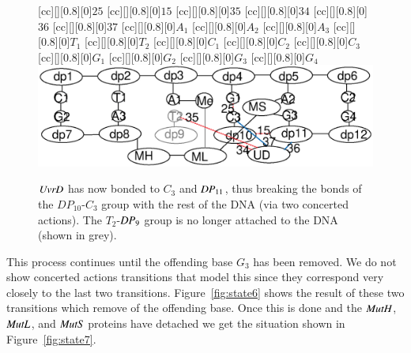 \begin{figure}[h!]
[cc][][0.8][0]{$25$}
[cc][][0.8][0]{$15$}
[cc][][0.8][0]{$35$}
[cc][][0.8][0]{$34$}
[cc][][0.8][0]{$36$}
[cc][][0.8][0]{$37$}
[cc][][0.8][0]{${A_1}$}
[cc][][0.8][0]{${A_2}$}
[cc][][0.8][0]{${A_3}$}
[cc][][0.8][0]{${T_1}$}
[cc][][0.8][0]{\color{gray}${T_2}$}
[cc][][0.8][0]{${C_1}$}
[cc][][0.8][0]{${C_2}$}
[cc][][0.8][0]{${C_3}$}
[cc][][0.8][0]{${G_1}$}
[cc][][0.8][0]{${G_2}$}
[cc][][0.8][0]{${G_3}$}
[cc][][0.8][0]{${G_4}$}
  \centering
    \includegraphics[width=1.0\textwidth]{mmr/state4}
  \caption[A six base pair DNA fragment.]{%
  $\mathit{UvrD}$ has now bonded to $C_3$ and $\mathit{DP}_{11}$, thus breaking the bonds of the $DP_{10}$-$C_3$ group with the rest of the DNA (via two concerted actions). The $T_2$-$\mathit{DP}_{9}$ group is no longer attached to the DNA (shown in grey). %
}
  \label{fig:state4}
\end{figure}

This process continues until the offending base $G_3$ has been removed. We do not show concerted actions transitions that model this since they correspond very closely to the last two transitions. Figure~\ref{fig:state6} shows the result of these two transitions which remove of the offending base.
Once this is done and the $\mathit{MutH}$, $\mathit{MutL}$, and $\mathit{MutS}$ proteins have detached we get the situation shown in Figure~\ref{fig:state7}.


